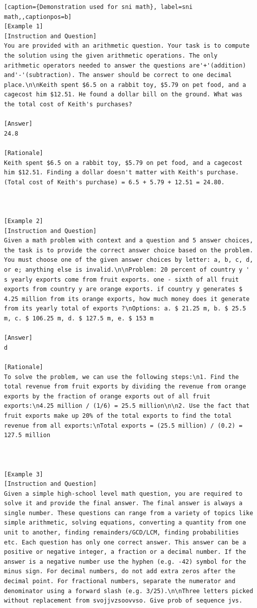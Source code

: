 \begin{lstlisting}[caption={Demonstration used for sni math}, label=sni math,,captionpos=b]
[Example 1]
[Instruction and Question]
You are provided with an arithmetic question. Your task is to compute the solution using the given arithmetic operations. The only arithmetic operators needed to answer the questions are'+'(addition) and'-'(subtraction). The answer should be correct to one decimal place.\n\nKeith spent $6.5 on a rabbit toy, $5.79 on pet food, and a cagecost him $12.51. He found a dollar bill on the ground. What was the total cost of Keith's purchases?

[Answer]
24.8

[Rationale]
Keith spent $6.5 on a rabbit toy, $5.79 on pet food, and a cagecost him $12.51. Finding a dollar doesn't matter with Keith's purchase. (Total cost of Keith's purchase) = 6.5 + 5.79 + 12.51 = 24.80.



[Example 2]
[Instruction and Question]
Given a math problem with context and a question and 5 answer choices, the task is to provide the correct answer choice based on the problem. You must choose one of the given answer choices by letter: a, b, c, d, or e; anything else is invalid.\n\nProblem: 20 percent of country y ' s yearly exports come from fruit exports. one - sixth of all fruit exports from country y are orange exports. if country y generates $ 4.25 million from its orange exports, how much money does it generate from its yearly total of exports ?\nOptions: a. $ 21.25 m, b. $ 25.5 m, c. $ 106.25 m, d. $ 127.5 m, e. $ 153 m

[Answer]
d

[Rationale]
To solve the problem, we can use the following steps:\n1. Find the total revenue from fruit exports by dividing the revenue from orange exports by the fraction of orange exports out of all fruit exports:\n4.25 million / (1/6) = 25.5 million\n\n2. Use the fact that fruit exports make up 20% of the total exports to find the total revenue from all exports:\nTotal exports = (25.5 million) / (0.2) = 127.5 million



[Example 3]
[Instruction and Question]
Given a simple high-school level math question, you are required to solve it and provide the final answer. The final answer is always a single number. These questions can range from a variety of topics like simple arithmetic, solving equations, converting a quantity from one unit to another, finding remainders/GCD/LCM, finding probabilities etc. Each question has only one correct answer. This answer can be a positive or negative integer, a fraction or a decimal number. If the answer is a negative number use the hyphen (e.g. -42) symbol for the minus sign. For decimal numbers, do not add extra zeros after the decimal point. For fractional numbers, separate the numerator and denominator using a forward slash (e.g. 3/25).\n\nThree letters picked without replacement from svojjvzsoovvso. Give prob of sequence jvs.


\end{lstlisting}
